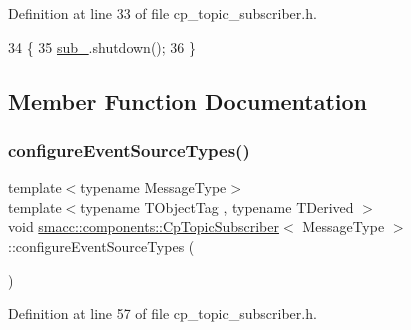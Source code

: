 Definition at line 33 of file cp\+\_\+topic\+\_\+subscriber.\+h.


\begin{DoxyCode}
34     \{
35         \hyperlink{classsmacc_1_1components_1_1CpTopicSubscriber_a87f9c87f6b7c0801dff4fcc7519dbe0e}{sub\_}.shutdown();
36     \}
\end{DoxyCode}


\subsection{Member Function Documentation}
\mbox{\label{classsmacc_1_1components_1_1CpTopicSubscriber_a20946cb2d50ea4d1bda2a5331940af33}} 
\subsubsection{\texorpdfstring{configure\+Event\+Source\+Types()}{configureEventSourceTypes()}}
{\footnotesize\ttfamily template$<$typename Message\+Type$>$ \\
template$<$typename T\+Object\+Tag , typename T\+Derived $>$ \\
void \hyperlink{classsmacc_1_1components_1_1CpTopicSubscriber}{smacc\+::components\+::\+Cp\+Topic\+Subscriber}$<$ Message\+Type $>$\+::configure\+Event\+Source\+Types (\begin{DoxyParamCaption}{ }\end{DoxyParamCaption})\hspace{0.3cm}{\ttfamily [inline]}}



Definition at line 57 of file cp\+\_\+topic\+\_\+subscriber.\+h.


